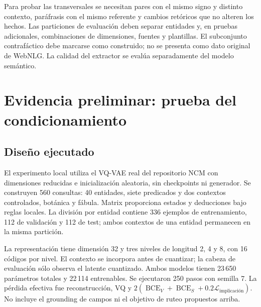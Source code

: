 \documentclass[11pt,a4paper]{article}
\newcommand{\loss}{\mathcal{L}}
\begin{document}
Para probar las transversales se necesitan pares con el mismo signo y distinto
contexto, paráfrasis con el mismo referente y cambios retóricos que no alteren
los hechos. Las particiones de evaluación deben separar entidades y, en pruebas
adicionales, combinaciones de dimensiones, fuentes y plantillas. El subconjunto
contrafáctico debe marcarse como construido; no se presenta como dato original
de WebNLG. La calidad del extractor se evalúa separadamente del modelo semántico.

\section{Evidencia preliminar: prueba del condicionamiento}
\subsection{Diseño ejecutado}
El experimento local utiliza el VQ-VAE real del repositorio NCM con dimensiones
reducidas e inicialización aleatoria, sin checkpoints ni generador. Se construyen
560 consultas: 40 entidades, siete predicados y dos contextos controlados,
botánica y fábula. Matrix proporciona estados y deducciones bajo reglas locales.
La división por entidad contiene 336 ejemplos de entrenamiento, 112 de validación
y 112 de test; ambos contextos de una entidad permanecen en la misma partición.

La representación tiene dimensión 32 y tres niveles de longitud 2, 4 y 8, con
16 códigos por nivel. El contexto se incorpora antes de cuantizar; la cabeza de
evaluación sólo observa el latente cuantizado. Ambos modelos tienen 23\,650
parámetros totales y 22\,114 entrenables. Se ejecutaron 250 pasos con semilla 7.
La pérdida efectiva fue reconstrucción, VQ y
$2(\operatorname{BCE}_{V}+\operatorname{BCE}_{S}+0.2\loss_{\text{implicación}})$.
No incluye el grounding de campos ni el objetivo de ruteo propuestos arriba.
\end{document}
